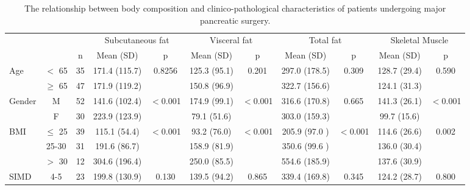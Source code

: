 \begin{sidewaystable}[p]
	\caption{The relationship between body composition and clinico-pathological characteristics of patients undergoing major pancreatic surgery.}
	\label{table:bc_clinical}
	\footnotesize
	\renewcommand{\arraystretch}{1.2} %
	\setlength{\tabcolsep}{9pt} %
	\centering
	\begin{tabular}{|l c c | c c| c c | c c | c c|}
		\hline
		                          &           &    & \multicolumn{2}{c|}{Subcutaneous fat} & \multicolumn{2}{c|}{Visceral fat} & \multicolumn{2}{c|}{Total fat} & \multicolumn{2}{c|}{Skeletal Muscle} \\
		                          &           & n  & Mean (SD)     & p                     & Mean (SD)     & p                 & Mean (SD)     & p              & Mean (SD)    & p                     \\ \hline
		Age                       & $<$ 65    & 35 & 171.4 (115.7) & 0.8256                & 125.3 (95.1)  & 0.201             & 297.0 (178.5) & 0.309          & 128.7 (29.4) & 0.590                 \\
		                          & $\geq$ 65 & 47 & 171.9 (119.2) &                       & 150.8 (96.9)  &                   & 322.7 (156.6) &                & 124.1 (31.3) &  \\
		Gender                    & M         & 52 & 141.6 (102.4) & $<$0.001              & 174.9 (99.1)  & $<$0.001          & 316.6 (170.8) & 0.665          & 141.3 (26.1) & $<$0.001              \\
		                          & F         & 30 & 223.9 (123.9) &                       & 79.1 (51.6)   &                   & 303.0 (159.3) &                & 99.7 (15.6)  &  \\
		BMI                       & $\leq$ 25 & 39 & 115.1 (54.4)  & $<$0.001              & 93.2 (76.0)   & $<$0.001          & 205.9 (97.0 ) & $<$0.001       & 114.6 (26.6) & 0.002                 \\
		                          & 25-30     & 31 & 191.6 (86.7)  &                       & 158.9 (81.9)  &                   & 350.6 (99.6 ) &                & 136.0 (30.4) &  \\
		                          & $>$ 30    & 12 & 304.6 (196.4) &                       & 250.0 (85.5)  &                   & 554.6 (185.9) &                & 137.6 (30.9) &  \\
		SIMD                      & 4-5       & 23 & 199.8 (130.9) & 0.130                 & 139.5 (94.2)  & 0.865             & 339.4 (169.8) & 0.345          & 124.2 (28.7) & 0.800                 \\

\end{tabular}
\end{sidewaystable}

